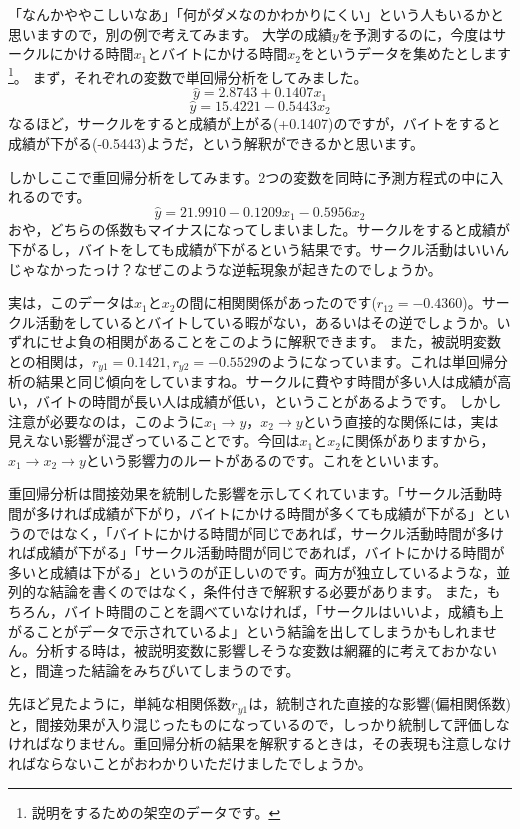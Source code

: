 \documentclass{ltjbook}
\begin{document}
「なんかややこしいなあ」「何がダメなのかわかりにくい」という人もいるかと思いますので，別の例で考えてみます。
大学の成績$y$を予測するのに，今度はサークルにかける時間$x_1$とバイトにかける時間$x_2$をというデータを集めたとします\footnote{説明をするための架空のデータです。}。
まず，それぞれの変数で単回帰分析をしてみました。
\[ \hat{y} = 2.8743 + 0.1407 x_1 \]
\[ \hat{y} = 15.4221 -0.5443 x_2 \]
なるほど，サークルをすると成績が上がる(+0.1407)のですが，バイトをすると成績が下がる(-0.5443)ようだ，という解釈ができるかと思います。

しかしここで重回帰分析をしてみます。2つの変数を同時に予測方程式の中に入れるのです。
\[\hat{y} = 21.9910 -0.1209 x_1 - 0.5956x_2\]
おや，どちらの係数もマイナスになってしまいました。サークルをすると成績が下がるし，バイトをしても成績が下がるという結果です。サークル活動はいいんじゃなかったっけ？なぜこのような逆転現象が起きたのでしょうか。

実は，このデータは$x_1$と$x_2$の間に相関関係があったのです($r_{12}=-0.4360$)。サークル活動をしているとバイトしている暇がない，あるいはその逆でしょうか。いずれにせよ負の相関があることをこのように解釈できます。
また，被説明変数との相関は，$r_{y1}=0.1421,r_{y2}=-0.5529$のようになっています。これは単回帰分析の結果と同じ傾向をしていますね。サークルに費やす時間が多い人は成績が高い，バイトの時間が長い人は成績が低い，ということがあるようです。
しかし注意が必要なのは，このように$x_1 \to y$，$x_2 \to y$という直接的な関係には，実は見えない影響が混ざっていることです。今回は$x_1$と$x_2$に関係がありますから，$x_1 \to x_2 \to y$という影響力のルートがあるのです。これをといいます。

重回帰分析は間接効果を統制した影響を示してくれています。「サークル活動時間が多ければ成績が下がり，バイトにかける時間が多くても成績が下がる」というのではなく，「バイトにかける時間が同じであれば，サークル活動時間が多ければ成績が下がる」「サークル活動時間が同じであれば，バイトにかける時間が多いと成績は下がる」というのが正しいのです。両方が独立しているような，並列的な結論を書くのではなく，条件付きで解釈する必要があります。
また，もちろん，バイト時間のことを調べていなければ，「サークルはいいよ，成績も上がることがデータで示されているよ」という結論を出してしまうかもしれません。分析する時は，被説明変数に影響しそうな変数は網羅的に考えておかないと，間違った結論をみちびいてしまうのです。

先ほど見たように，単純な相関係数$r_{y1}$は，統制された直接的な影響(偏相関係数)と，間接効果が入り混じったものになっているので，しっかり統制して評価しなければなりません。重回帰分析の結果を解釈するときは，その表現も注意しなければならないことがおわかりいただけましたでしょうか。
\end{document}
